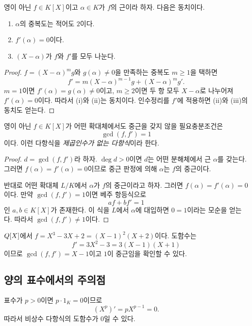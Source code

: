 \begin{theorem}[중근 판정]
영이 아닌 $f\in K[X]$이고 $\alpha\in K$가 $f$의 근이라 하자. 다음은 동치이다.
\begin{enumerate}[label=(\roman*)]
  \item $\alpha$의 중복도는 적어도 $2$이다.
  \item $f'(\alpha)=0$이다.
  \item $(X-\alpha)$가 $f$와 $f'$를 모두 나눈다.
\end{enumerate}
\end{theorem}

\begin{proof}
$f=(X-\alpha)^mg$와 $g(\alpha)\ne0$을 만족하는 중복도 $m\ge1$을 택하면
\[
 f'=m(X-\alpha)^{m-1}g+(X-\alpha)^mg'.
\]
$m=1$이면 $f'(\alpha)=g(\alpha)\ne0$이고, $m\ge2$이면 두 항 모두 $X-\alpha$로 나누어져 $f'(\alpha)=0$이다. 따라서 (i)와 (ii)는 동치이다. 인수정리를 $f'$에 적용하면 (ii)와 (iii)의 동치도 얻는다.
\end{proof}

\begin{corollary}
영이 아닌 $f\in K[X]$가 어떤 확대체에서도 중근을 갖지 않을 필요충분조건은
\[
  \gcd(f,f')=1
\]
이다. 이런 다항식을 \emph{제곱인수가 없는 다항식}이라 한다.
\end{corollary}

\begin{proof}
$d=\gcd(f,f')$라 하자. $\deg d>0$이면 $d$는 어떤 분해체에서 근 $\alpha$를 갖는다. 그러면 $f(\alpha)=f'(\alpha)=0$이므로 중근 판정에 의해 $\alpha$는 $f$의 중근이다.

반대로 어떤 확대체 $L/K$에서 $\alpha$가 $f$의 중근이라고 하자. 그러면 $f(\alpha)=f'(\alpha)=0$이다. 만약 $\gcd(f,f')=1$이면 베주 항등식으로
\[
  af+bf'=1
\]
인 $a,b\in K[X]$가 존재한다. 이 식을 $L$에서 $\alpha$에 대입하면 $0=1$이라는 모순을 얻는다. 따라서 $\gcd(f,f')\ne1$이다.
\end{proof}

\begin{example}
$Q[X]$에서 $f=X^3-3X+2=(X-1)^2(X+2)$이다. 도함수는
\[
 f'=3X^2-3=3(X-1)(X+1)
\]
이므로 $\gcd(f,f')=X-1$이고 $1$이 중근임을 확인할 수 있다.
\end{example}

\subsection{양의 표수에서의 주의점}

표수가 $p>0$이면 $p\cdot1_K=0$이므로
\[
 (X^p)'=pX^{p-1}=0.
\]
따라서 비상수 다항식의 도함수가 $0$일 수 있다.

